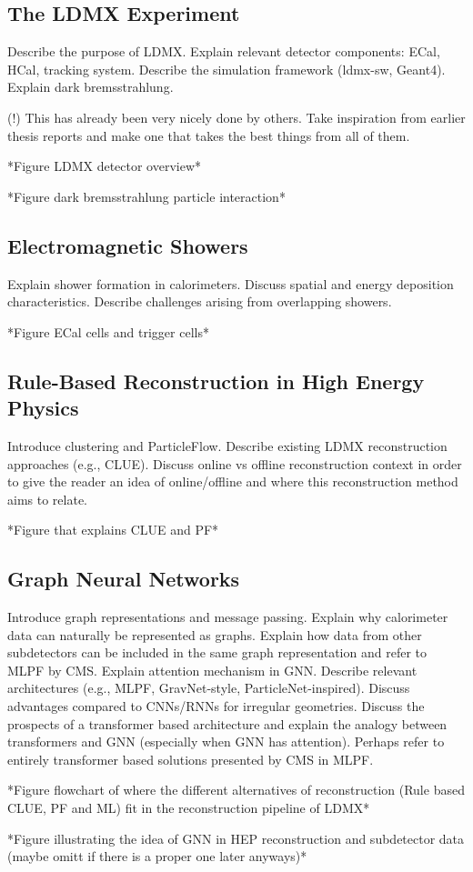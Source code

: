 \subsection{The LDMX Experiment}
Describe the purpose of LDMX.
Explain relevant detector components: ECal, HCal, tracking system.
Describe the simulation framework (ldmx-sw, Geant4). Explain dark bremsstrahlung.

(!) This has already been very nicely done by others. Take inspiration from earlier thesis reports and make one that takes the best things from all of them.

*Figure LDMX detector overview*

*Figure dark bremsstrahlung particle interaction*

\subsection{Electromagnetic Showers}
Explain shower formation in calorimeters.
Discuss spatial and energy deposition characteristics.
Describe challenges arising from overlapping showers.

*Figure ECal cells and trigger cells*

\subsection{Rule-Based Reconstruction in High Energy Physics}
Introduce clustering and ParticleFlow.
Describe existing LDMX reconstruction approaches (e.g., CLUE).
Discuss online vs offline reconstruction context in order to give the reader an idea of online/offline and where this reconstruction method aims to relate.

*Figure that explains CLUE and PF*


\subsection{Graph Neural Networks}
Introduce graph representations and message passing.
Explain why calorimeter data can naturally be represented as graphs. Explain how data from other subdetectors can be included in the same graph representation and refer to MLPF by CMS.
Explain attention mechanism in GNN.
Describe relevant architectures (e.g., MLPF, GravNet-style, ParticleNet-inspired).
Discuss advantages compared to CNNs/RNNs for irregular geometries.
Discuss the prospects of a transformer based architecture and explain the analogy between transformers and GNN (especially when GNN has attention). Perhaps refer to entirely transformer based solutions presented by CMS in MLPF. 

*Figure flowchart of where the different alternatives of reconstruction (Rule based CLUE, PF and ML) fit in the reconstruction pipeline of LDMX*

*Figure illustrating the idea of GNN in HEP reconstruction and subdetector data (maybe omitt if there is a proper one later anyways)*
